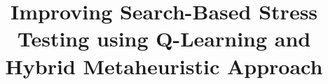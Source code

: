 \documentclass{bmcart}
\begin{document}
\begin{frontmatter}

\begin{fmbox}


\title{Improving Search-Based Stress Testing using Q-Learning and Hybrid Metaheuristic Approach}


\author[
   addressref={aff1},                   %
   corref={aff1},                       %
   noteref={n1},                        %
   email={naubergois@gmail.com}   %
]{ }
\author[
   addressref={aff1},
   email={porfirio@unifor.br}
]{ }
\author[
   addressref={aff1},
   email={acoelho@unifor.br}
]{ }



\address[id=aff1]{%
  , %
  ,                     %
  ,                              %
}


\end{fmbox}
\end{frontmatter}
\end{document}
